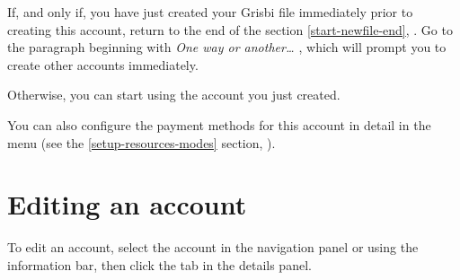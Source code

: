 If, and only if, you have just created your Grisbi file immediately prior to creating this account, return to the end of the section \vref{start-newfile-end}, . Go to the paragraph beginning with \emph{One way or another\ldots{ }}, which will prompt you to create other accounts immediately.

Otherwise, you can start using the account you just created.

You can also configure the payment methods for this account in detail in the  menu (see the \vref{setup-resources-modes} section, ).


\section{Editing an account\label{accounts-modify}}%

To edit an account, select the account in the navigation panel or using the information bar, then click the  tab in the details panel.

